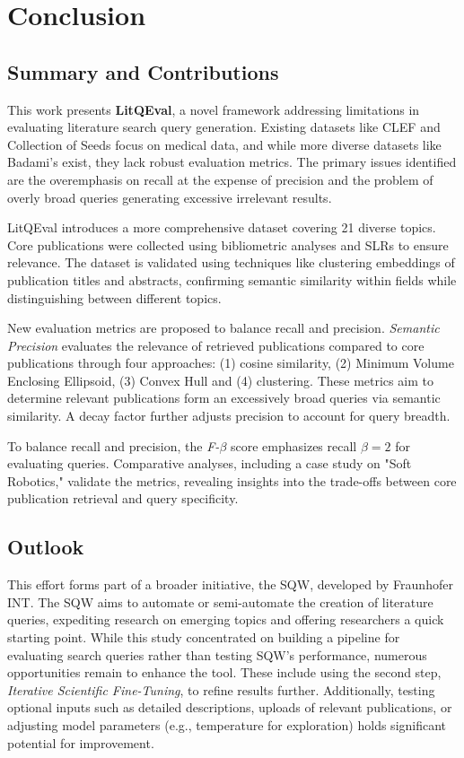 \chapter{Conclusion}\label{ch:conclusion}

\section{Summary and Contributions}
This work presents \textbf{LitQEval}, a novel framework addressing limitations in evaluating literature search query generation. Existing datasets like CLEF and Collection of Seeds focus on medical data, and while more diverse datasets like Badami’s \autocite{badami2023adaptive} exist, they lack robust evaluation metrics. The primary issues identified are the overemphasis on recall at the expense of precision and the problem of overly broad queries generating excessive irrelevant results. 

LitQEval introduces a more comprehensive dataset covering 21 diverse topics. Core publications were collected using bibliometric analyses and SLRs to ensure relevance. The dataset is validated using techniques like clustering embeddings of publication titles and abstracts, confirming semantic similarity within fields while distinguishing between different topics.

New evaluation metrics are proposed to balance recall and precision. \textit{Semantic Precision} evaluates the relevance of retrieved publications compared to core publications through four approaches: (1) cosine similarity, (2) Minimum Volume Enclosing Ellipsoid, (3) Convex Hull and (4) clustering. These metrics aim to determine relevant publications form an excessively broad queries via semantic similarity. A decay factor further adjusts precision to account for query breadth.

To balance recall and precision, the \textit{ F-$\beta$ }score emphasizes recall $\beta=2$ for evaluating queries. Comparative analyses, including a case study on "Soft Robotics," validate the metrics, revealing insights into the trade-offs between core publication retrieval and query specificity.

\section{Outlook}
This effort forms part of a broader initiative, the SQW, developed by Fraunhofer INT. The SQW aims to automate or semi-automate the creation of literature queries, expediting research on emerging topics and offering researchers a quick starting point. While this study concentrated on building a pipeline for evaluating search queries rather than testing SQW's performance, numerous opportunities remain to enhance the tool. These include using the second step, \textit{Iterative Scientific Fine-Tuning}, to refine results further. Additionally, testing optional inputs such as detailed descriptions, uploads of relevant publications, or adjusting model parameters (e.g., temperature for exploration) holds significant potential for improvement.


